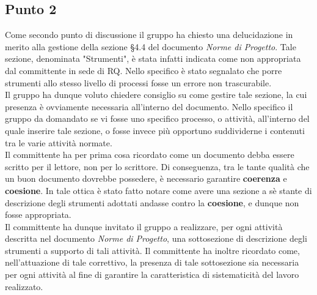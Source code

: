 \subsection{Punto 2}
Come secondo punto di discussione il gruppo ha chiesto una delucidazione in merito alla gestione della sezione §4.4 del documento \textit{Norme di Progetto}. Tale sezione, denominata "Strumenti", è stata infatti indicata come non appropriata dal committente in sede di RQ. Nello specifico è stato segnalato che porre strumenti allo stesso livello di processi fosse un errore non trascurabile.\\
Il gruppo ha dunque voluto chiedere consiglio su come gestire tale sezione, la cui presenza è ovviamente necessaria all'interno del documento. Nello specifico il gruppo da domandato se vi fosse uno specifico processo, o attività, all'interno del quale inserire tale sezione, o fosse invece più opportuno suddividerne i contenuti tra le varie attività normate.\\
Il committente ha per prima cosa ricordato come un documento debba essere scritto per il lettore, non per lo scrittore. Di conseguenza, tra le tante qualità che un buon documento dovrebbe possedere, è necessario garantire \textbf{coerenza} e \textbf{coesione}. In tale ottica è stato fatto notare come avere una sezione a sè stante di descrizione degli strumenti adottati andasse contro la \textbf{coesione}, e dunque non fosse appropriata.\\
Il committente ha dunque invitato il gruppo a realizzare, per ogni attività descritta nel documento \textit{Norme di Progetto}, una sottosezione di descrizione degli strumenti a supporto di tali attività. Il committente ha inoltre ricordato come, nell'attuazione di tale correttivo, la presenza di tale sottosezione sia necessaria per ogni attività al fine di garantire la caratteristica di sistematicità del lavoro realizzato.


